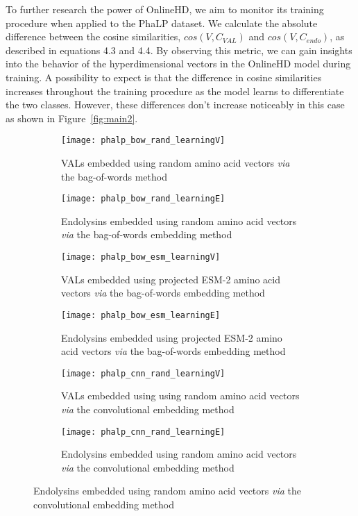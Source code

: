 To further research the power of OnlineHD, we aim to monitor its training procedure when applied to the PhaLP dataset. We calculate the absolute difference between the cosine similarities, $cos(V, C_{VAL})$ and $cos(V, C_{endo})$, as described in equations 4.3 and 4.4. By observing this metric, we can gain insights into the behavior of the hyperdimensional vectors in the OnlineHD model during training. A possibility to expect is that the difference in cosine similarities increases throughout the training procedure as the model learns to differentiate the two classes. However, these differences don't increase noticeably in this case as shown in Figure~\ref{fig:main2}.

\begin{figure}[htbp]
    \centering
    \begin{subfigure}{0.48\textwidth}
        \texttt{[image: phalp\_bow\_rand\_learningV]}
        \caption{VALs embedded using random amino acid vectors \textit{via} the bag-of-words method}
        \label{fig:subfig-a}
    \end{subfigure}
    \hfill
    \begin{subfigure}{0.48\textwidth}
        \texttt{[image: phalp\_bow\_rand\_learningE]}
        \caption{Endolysins embedded using random amino acid vectors \textit{via} the bag-of-words embedding method}
        \label{fig:subfig-b}
    \end{subfigure}
    
    \begin{subfigure}{0.48\textwidth}
        \texttt{[image: phalp\_bow\_esm\_learningV]}
        \caption{VALs embedded using projected ESM-2 amino acid vectors \textit{via} the bag-of-words embedding method}
        \label{fig:subfig-c}
    \end{subfigure}
    \hfill
    \begin{subfigure}{0.48\textwidth}
        \texttt{[image: phalp\_bow\_esm\_learningE]}
        \caption{Endolysins embedded using projected ESM-2 amino acid vectors \textit{via} the bag-of-words embedding method}
        \label{fig:subfig-d}
    \end{subfigure}
    
    \begin{subfigure}{0.48\textwidth}
        \texttt{[image: phalp\_cnn\_rand\_learningV]}
        \caption{VALs embedded using using random amino acid vectors \textit{via} the convolutional embedding method}
        \label{fig:subfig-e}
    \end{subfigure}
    \hfill
    \begin{subfigure}{0.48\textwidth}
        \texttt{[image: phalp\_cnn\_rand\_learningE]}
        \caption{Endolysins embedded using random amino acid vectors \textit{via} the convolutional embedding method}
        \label{fig:subfig-f}
    \end{subfigure}
    

\end{figure}
